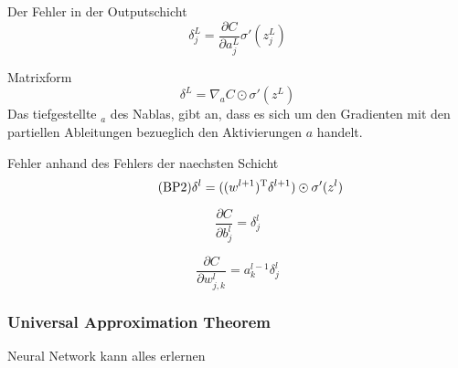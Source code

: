 \documentclass[../main]{subfiles}
\begin{document}
Der Fehler in der Outputschicht
\begin{equation}\tag{BP1}
  \delta_j^L = \frac{\partial C}{\partial a_j^L} \sigma'(z_j^L)
\end{equation}

Matrixform
\begin{equation}\tag{BP1a}
  \delta^L = \nabla_aC \odot \sigma'(z^L)
\end{equation}
Das tiefgestellte $_a$ des Nablas, gibt an, dass es sich um den Gradienten mit den partiellen
Ableitungen bezueglich den Aktivierungen $a$ handelt.

Fehler anhand des Fehlers der naechsten Schicht
\begin{equation}\tag{BP2}
  \delta^l = ((w^{l+1})^\mathrm{T} \delta^{l+1}) \odot \sigma'(z^l)
\end{equation}

\begin{equation}\tag{BP3}
  \frac{\partial C}{\partial b_j^l} = \delta_j^l
\end{equation}

\begin{equation}\tag{BP4}
  \frac{\partial C}{\partial w_{j,k}^l} = a_k^{l-1} \delta_j^l
\end{equation}



\subsubsection{Universal Approximation Theorem}\label{sec:UAT}
Neural Network kann alles erlernen

\pagebreak
\end{document}
